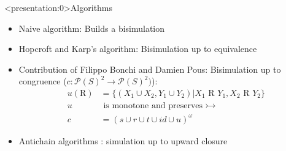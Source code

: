 \begin{frame}<presentation:0>{Algorithms}
  \begin{itemize}
    \item Naive algorithm: Builds a bisimulation
    \item Hopcroft and Karp's algorithm\cite{hopcroft1971linear}: Bisimulation up to equivalence
    \item Contribution of Filippo Bonchi and Damien Pous\cite{bonchi2013checking}:
      Bisimulation up to congruence ($c : \mathcal{P}(S)^2 \to \mathcal{P}(S)^2)$):\\
        \begin{align}
          u(\text{R}) &= \{(X_1 \cup X_2, Y_1 \cup Y_2) | X_1 \text{ R } Y_1, X_2 \text{ R } Y_2\}\\
          u&\text{ is monotone and preserves }\rightarrowtail\\
          c &= (s \cup r \cup t \cup id \cup u)^\omega
        \end{align}
    \item Antichain algorithms
      \cite{doyen2010antichain}\cite{abdulla2010simulation}\cite{lengal2012vata}:
      simulation up to upward closure
  \end{itemize}
\end{frame}
